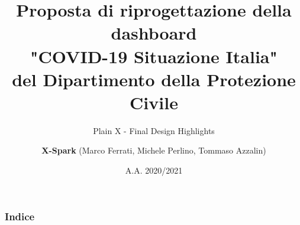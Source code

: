 





\title[Inf UFG]{Proposta di riprogettazione della dashboard\\
"COVID-19 Situazione Italia"\\
del Dipartimento della Protezione Civile}
\subtitle{Plain X - Final Design Highlights}

\author{\textbf{X-Spark} (Marco Ferrati, Michele Perlino, Tommaso Azzalin)}

\date{A.A. 2020/2021}
\frame[noframenumbering]{\titlepage}

\linespread{1.15}

\begin{frame}
    \frametitle{Indice}
    {
        \hypersetup{linkcolor=black}
        \tableofcontents
    }
\end{frame}








